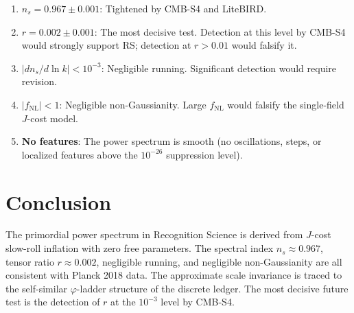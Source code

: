 \documentclass[12pt,a4paper]{article}
\theoremstyle{definition}
\theoremstyle{remark}
\begin{document}
\begin{enumerate}
  \item \textbf{$n_s = 0.967 \pm 0.001$}: Tightened by
  CMB-S4 and LiteBIRD.

  \item \textbf{$r = 0.002 \pm 0.001$}: The most
  decisive test.  Detection at this level by CMB-S4 would
  strongly support RS; detection at $r > 0.01$ would
  falsify it.

  \item \textbf{$|dn_s/d\ln k| < 10^{-3}$}: Negligible
  running.  Significant detection would require revision.

  \item \textbf{$|f_{\mathrm{NL}}| < 1$}: Negligible
  non-Gaussianity.  Large $f_{\mathrm{NL}}$ would falsify
  the single-field $J$-cost model.

  \item \textbf{No features}: The power spectrum is smooth
  (no oscillations, steps, or localized features above
  the $10^{-26}$ suppression level).
\end{enumerate}

\section{Conclusion}
\label{sec:conclusion}

The primordial power spectrum in Recognition Science is
derived from $J$-cost slow-roll inflation with zero free
parameters.  The spectral index $n_s \approx 0.967$,
tensor ratio $r \approx 0.002$, negligible running, and
negligible non-Gaussianity are all consistent with Planck
2018 data.  The approximate scale invariance is traced to
the self-similar $\varphi$-ladder structure of the discrete
ledger.  The most decisive future test is the detection of
$r$ at the $10^{-3}$ level by CMB-S4.
\end{document}
